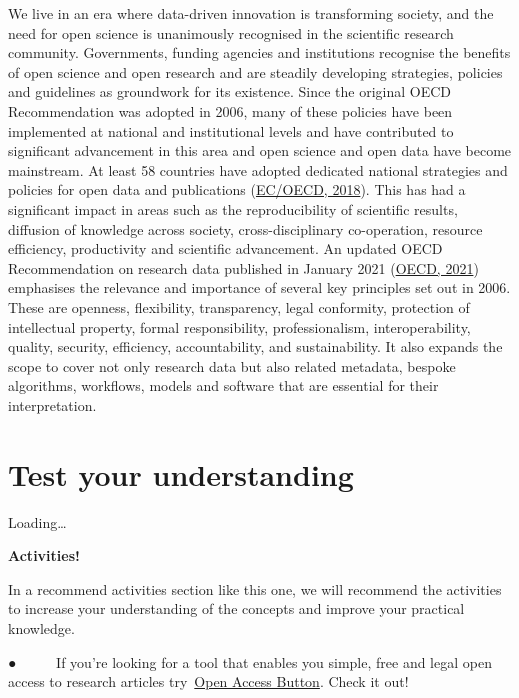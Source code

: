 \documentclass[
]{book}
\begin{document}
We live in an era where data-driven innovation is transforming society, and the need for open science is unanimously recognised in the scientific research community. Governments, funding agencies and institutions recognise the benefits of open science and open research and are steadily developing strategies, policies and guidelines as groundwork for its existence. Since the original OECD Recommendation was adopted in 2006, many of these policies have been implemented at national and institutional levels and have contributed to significant advancement in this area and open science and open data have become mainstream. At least 58 countries have adopted dedicated national strategies and policies for open data and publications (\href{https://stip.oecd.org/stip.html}{EC/OECD, 2018}). This has had a significant impact in areas such as the reproducibility of scientific results, diffusion of knowledge across society, cross-disciplinary co-operation, resource efficiency, productivity and scientific advancement. An updated OECD Recommendation on research data published in January 2021 (\href{https://www.oecd.org/sti/recommendation-access-to-research-data-from-public-funding.htm\#:~:text=On\%2020\%20January\%202021\%2C\%20the,shown\%20in\%20the\%20figure\%20below.}{OECD, 2021}) emphasises the relevance and importance of several key principles set out in 2006. These are openness, flexibility, transparency, legal conformity, protection of intellectual property, formal responsibility, professionalism, interoperability, quality, security, efficiency, accountability, and sustainability. It also expands the scope to cover not only research data but also related metadata, bespoke algorithms, workflows, models and software that are essential for their interpretation.

\hypertarget{test-your-understanding-1}{%
\section{Test your understanding}\label{test-your-understanding-1}}

Loading\ldots{}

\textbf{Activities!}

In a recommend activities section like this one, we will recommend the activities to increase your understanding of the concepts and improve your practical knowledge.

● ~ ~ ~ If you're looking for a tool that enables you simple, free and legal open access to research articles try~\href{https://openaccessbutton.org/}{}\href{https://openaccessbutton.org/}{Open Access Button}. Check it out!
\end{document}
